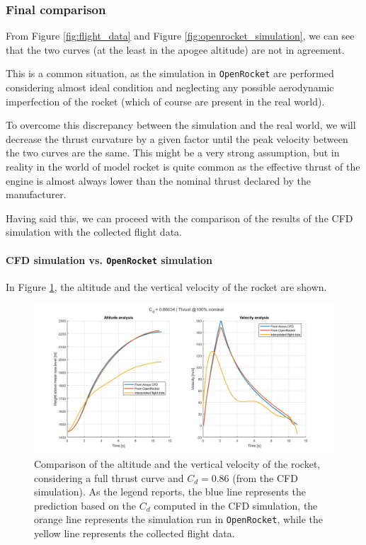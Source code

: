 \subsubsection{Final comparison}
\label{subsubsec:final_comparison}

From Figure \ref{fig:flight_data} and Figure \ref{fig:openrocket_simulation}, we can see that the two curves (at the least in the apogee altitude) are not in agreement.

This is a common situation, as the simulation in \texttt{OpenRocket} are performed considering almost ideal condition and neglecting any possible aerodynamic imperfection of the rocket (which of course are present in the real world).

To overcome this discrepancy between the simulation and the real world, we will decrease the thrust curvature by a given factor until the peak velocity between the two curves are the same.
This might be a very strong assumption, but in reality in the world of model rocket is quite common as the effective thrust of the engine is almost always lower than the nominal thrust declared by the manufacturer.

Having said this, we can proceed with the comparison of the results of the CFD simulation with the collected flight data.

\paragraph{CFD simulation vs. \texttt{OpenRocket} simulation}

In Figure \ref{fig:comparison_flight_data}, the altitude and the vertical velocity of the rocket are shown.

\begin{figure}[H]
    \centering
    \includegraphics[width=\textwidth]{img/Validation/All_100.png}
    \caption{
        Comparison of the altitude and the vertical velocity of the rocket, considering a full thrust curve and $C_d = 0.86$ (from the CFD simulation).
        As the legend reports, the blue line represents the prediction based on the $C_d$ computed in the CFD simulation, the orange line represents the simulation run in \texttt{OpenRocket}, while the yellow line represents the collected flight data.
    }
    \label{fig:comparison_flight_data}
\end{figure}

